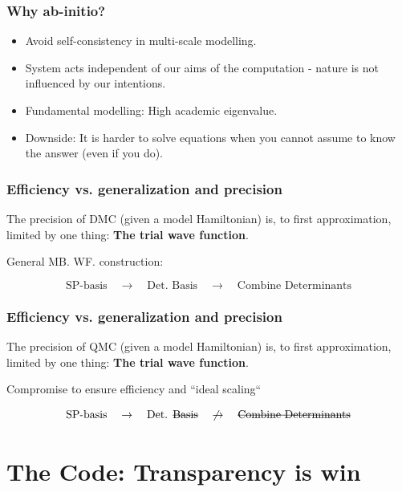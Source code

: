 \documentclass{beamer}
\begin{document}
\begin{frame}\frametitle{Why ab-initio?}

\begin{itemize}
 \item Avoid self-consistency in multi-scale modelling.
 \pause\item System acts independent of our aims of the computation - nature is not influenced by our intentions.
 \pause\item Fundamental modelling: High academic eigenvalue.
 \pause\item Downside: It is harder to solve equations when you cannot assume to know the answer (even if you do).
\end{itemize}

\end{frame}

\begin{frame}\frametitle{Efficiency vs. generalization and precision}

The precision of DMC (given a model Hamiltonian) is, to first approximation, limited by one thing: \textbf{The trial wave function}.

\pause
\vspace{0.5cm}
General MB. WF. construction:

\begin{equation*}
 \text{SP-basis} \quad \to \quad \text{Det. Basis} \quad \to \quad \text{Combine Determinants}
\end{equation*}


\end{frame}

\begin{frame}\frametitle{Efficiency vs. generalization and precision}

The precision of QMC (given a model Hamiltonian) is, to first approximation, limited by one thing: \textbf{The trial wave function}.


\vspace{0.5cm}
Compromise to ensure efficiency and ``ideal scaling``

\begin{equation*}
 \text{SP-basis} \quad \to \quad \text{Det. } \text{\sout{Basis}} \quad \not\to \quad \text{\sout{Combine Determinants}}
\end{equation*}


\end{frame}

\section{The Code: Transparency is win}
\end{document}
